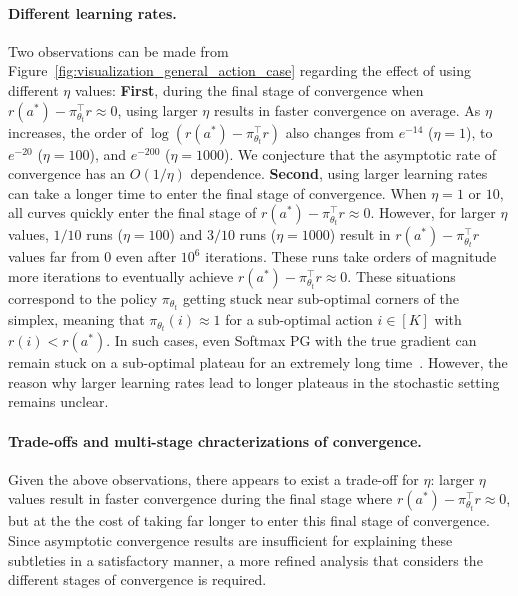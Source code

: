 \paragraph{Different learning rates.} 
Two observations can be made from Figure~\ref{fig:visualization_general_action_case} regarding the effect of using different $\eta$ values: \textbf{First}, during the final stage of convergence when $r(a^*) - \pi_{\theta_t}^\top r \approx 0$, using larger $\eta$ results in faster convergence on average. As $\eta$ increases, the order of $\log{ (r(a^*) - \pi_{\theta_t}^\top r) } $ also changes from $e^{-14}$ ($\eta = 1$), to $e^{-20}$ ($\eta = 100$), and $e^{-200}$ ($\eta = 1000$). We conjecture that the asymptotic rate of convergence has an $O(1/\eta)$ dependence. 
\textbf{Second}, using larger learning rates can take a longer time to enter the final stage of convergence. When $\eta = 1$ or $10$, all curves quickly enter the final stage of $r(a^*) - \pi_{\theta_t}^\top r \approx 0$. However, for larger $\eta$ values, $1/10$ runs ($\eta = 100$) and $3/10$ runs ($\eta = 1000$) result in $r(a^*) - \pi_{\theta_t}^\top r $ values far from $0$ even after $10^6$ iterations. These runs take orders of magnitude more iterations to eventually achieve $r(a^*) - \pi_{\theta_t}^\top r \approx 0$. These situations correspond to the policy $\pi_{\theta_t}$ getting stuck near sub-optimal corners of the simplex, meaning that $\pi_{\theta_t}(i) \approx 1$ for a sub-optimal action $i \in [K]$ with $r(i) < r(a^*)$. In such cases, even Softmax PG with the true gradient can remain stuck on a sub-optimal plateau for an extremely long time~\citep{mei2020global}. However, the reason why larger learning rates lead to longer plateaus in the stochastic setting remains unclear.

\paragraph{Trade-offs and multi-stage chracterizations of convergence.} Given the above observations, there appears to exist a trade-off for $\eta$: larger $\eta$ values result in faster convergence during the final stage where $r(a^*) - \pi_{\theta_t}^\top r \approx 0$, but at the the cost of taking far longer to enter this final stage of convergence. Since asymptotic convergence results are insufficient for explaining these subtleties in a satisfactory manner, a more refined analysis that considers the different stages of convergence is required. 

